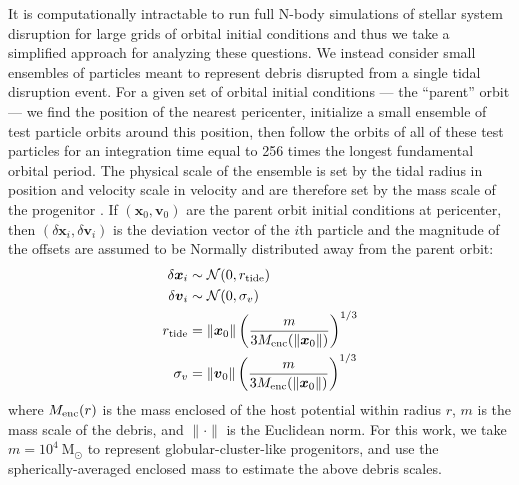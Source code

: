\documentclass[letterpaper,12pt,preprint]{aastex}
\newcommand{\msun}{\ensuremath{\mathrm{M}_\odot}}
\newcommand{\bs}[1]{\boldsymbol{#1}}
\begin{document}
It is computationally intractable to run full N-body simulations of stellar system disruption for large grids of orbital initial conditions and thus we take a simplified approach for analyzing these questions. We instead consider small ensembles of particles meant to represent debris disrupted from a single tidal disruption event. For a given set of orbital initial conditions --- the ``parent'' orbit --- we find the position of the nearest pericenter, initialize a small ensemble of test particle orbits around this position, then follow the orbits of all of these test particles for an integration time equal to 256 times the longest fundamental orbital period. The physical scale of the ensemble is set by the tidal radius in position and velocity scale in velocity and are therefore set by the mass scale of the progenitor \citep[e.g.,][]{johnston98, apw14}. If $(\bs{x}_0,\bs{v}_0)$ are the parent orbit initial conditions at pericenter, then $(\delta\bs{x}_i,\delta\bs{v}_i)$ is the deviation vector of the $i$th particle and the magnitude of the offsets are assumed to be Normally distributed away from the parent orbit:
\begin{align}
	\delta\bs{x}_i &\sim \mathcal{N}(0, r_{\rm tide})\\
	\delta\bs{v}_i &\sim \mathcal{N}(0, \sigma_v)\\
	r_{\rm tide} &= \|\bs{x}_0\| \left(\frac{m}{3M_{\rm enc}(\|\bs{x}_0\|)}\right)^{1/3} \\
	\sigma_v &= \|\bs{v}_0\|\left(\frac{m}{3M_{\rm enc}(\|\bs{x}_0\|)}\right)^{1/3} 
\end{align}
where $M_{\rm enc}(r)$ is the mass enclosed of the host potential within radius $r$, $m$ is the mass scale of the debris, and $\|\cdot \|$ is the Euclidean norm. For this work, we take $m=10^4~\msun$ to represent globular-cluster-like progenitors, and use the spherically-averaged enclosed mass to estimate the above debris scales.
\end{document}
